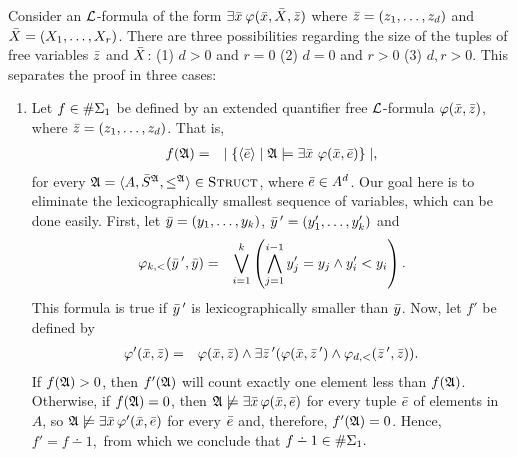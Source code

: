 Consider an $\L$-formula of the form $\exists\bar{x}\:\varphi(\bar{x},\bar{X},\bar{z})$ where $\bar{z} = (z_1,\dots,z_d)$ and $\bar{X} = (X_1,\dots,X_r)$. There are three possibilities regarding the size of the tuples of free variables $\bar{z}$ and $\bar{X}$: (1) $d>0$ and $r=0$ (2) $d=0$ and $r>0$ (3) $d,r>0$. This separates the proof in three cases:
\begin{enumerate}
	\item Let $f \in \#\Sigma_{1}$ be defined by an extended quantifier free $\L$-formula $\varphi(\bar{x},\bar{z})$, where $\bar{z} = (z_1,\dots,z_d)$. That is,
	\begin{eqnarray*}
		f(\mathfrak{A}) &=& \mid \{ \langle\bar{e}\rangle \mid \mathfrak{A} \models \exists \bar{x} \ \varphi(\bar{x},\bar{e}) \} \mid,
	\end{eqnarray*}
	for every $\mathfrak{A} = \langle A, \bar{S}^{\mathfrak{A}}, \leq^{\mathfrak{A}} \rangle \in \text{\sc Struct}$, where $\bar{e} \in A^d$. Our goal here is to eliminate the lexicographically smallest sequence of variables, which can be done easily. First, let $\bar{y} = (y_1,\dots,y_k)$, $\bar{y}\,^\prime = (y_1^\prime,\dots,y_k^\prime)$ and
	\begin{eqnarray*}
		\varphi_{k,<}(\bar{y}\,^\prime,\bar{y}) &=& \bigvee_{i = 1}^k \left( \bigwedge_{j=1}^{i-1} y_j^\prime = y_j \wedge y_i^\prime < y_i \right).
	\end{eqnarray*}
	This formula is true if $\bar{y}\,^\prime$ is lexicographically smaller than $\bar{y}$. Now, let $f'$ be defined by
	\begin{eqnarray*}
		\varphi^\prime(\bar{x},\bar{z}) &=& \varphi(\bar{x},\bar{z}) \wedge \exists \bar{z}\,^\prime (\varphi(\bar{x},\bar{z}\,^\prime) \wedge \varphi_{d,<}(\bar{z}\,^\prime,\bar{z} ) ).
	\end{eqnarray*}
	If $f(\mathfrak{A})>0$, then $f'(\mathfrak{A})$ will count exactly one element less than $f(\mathfrak{A})$. Otherwise, if $f(\mathfrak{A})=0$, then $\mathfrak{A} \not\models\exists \bar{x}\,\varphi(\bar{x},\bar{e})$ for every tuple $\bar{e}$ of elements in $A$, so $\mathfrak{A} \not\models\exists \bar{x}\,\varphi^\prime(\bar{x},\bar{e})$ for every $\bar{e}$ and, therefore, $f'(\mathfrak{A})=0$. Hence, $f' = f\dotminus 1,$ from which we conclude that $f\dotminus 1\in\E{1}.$
	

\end{enumerate}
